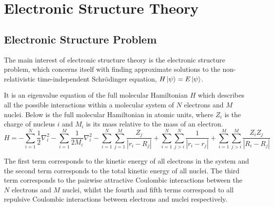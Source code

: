 \section{Electronic Structure Theory}

\subsection{Electronic Structure Problem}
The main interest of electronic structure theory is the electronic structure problem, which concerns itself with finding approximate solutions to the non-relativistic time-independent Schrödinger equation, $H\ket\psi = E\ket\psi$.

It is an eigenvalue equation of the full molecular Hamiltonian $H$ which describes all the possible interactions within a molecular system of $N$ electrons and $M$ nuclei. Below is the full molecular Hamiltonian in atomic units, where $Z_i$ is the charge of nucleus $i$ and $M_i$ is its mass relative to the mass of an electron.
\begin{equation*}
    H =
    - \sum_{i=1}^{N} \frac{1}{2} \nabla^{2}_{i}
    - \sum_{i=1}^{M} \frac{1}{2M_i} \nabla^{2}_{i}
    - \sum_{i=1}^{N} \sum_{j=1}^{M} \frac{Z_j}{|r_{i} - R_{j}|}
    + \sum_{i=1}^{N} \sum_{j>i}^{N} \frac{1}{|r_{i} - r_{j}|}
    + \sum_{i=1}^{M} \sum_{j>i}^{M} \frac{Z_{i} Z_{j}}{|R_{i} - R_{j}|}
\end{equation*}

The first term corresponds to the kinetic energy of all electrons in the system and the second term corresponds to the total kinetic energy of all nuclei. The third term corresponds to the pairwise attractive Coulombic interactions between the $N$ electrons and $M$ nuclei, whilst the fourth and fifth terms correspond to all repulsive Coulombic interactions between electrons and nuclei respectively.

